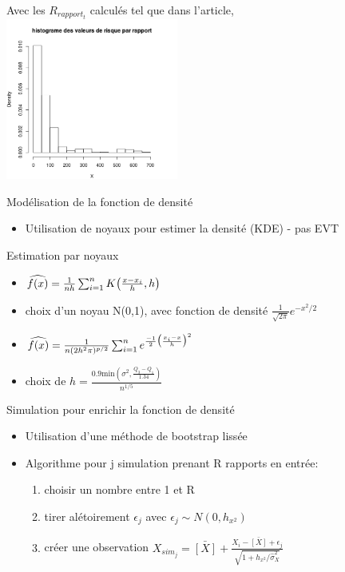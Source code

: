 \begin{frame}[t]
	Avec les $R_{rapport_t}$ calculés tel que dans l'article, \\
	\includegraphics[height=200px] {histogramme_par_rapport}
	
\end{frame}


\begin{frame}[t]
	
	Modélisation de la fonction de densité
	\begin{itemize}
	\item Utilisation de noyaux pour estimer la densité (KDE) - pas EVT
\end{itemize}

Estimation par noyaux 

\begin{itemize}
	\item $\widehat{f(x)} = \frac{1}{nh} \sum^{n}_{i=1}K\big{(} \frac{x-x_i}{h},h \big{)}$
	\item choix d'un noyau N(0,1), avec fonction de densité $\frac{1}{\sqrt{2\pi}}e^{-x^2/2}$
	\item $\widehat{f(x)} = \frac{1}{n(2h^2\pi)^{p/2}}\sum^{n}_{i=1}e^{\frac{-1}{2}\big{(}\frac{x_{i}-x}{h}\big{)}^2}$
	\item choix de $h = \frac{0.9 \textrm{min}(\sigma^2, \frac{Q_3-Q_1}{1.34})}{n^{1/5}}$
\end{itemize}


Simulation pour enrichir la fonction de densité

\begin{itemize}
	\item Utilisation d'une méthode de bootstrap lissée
	\item Algorithme pour j simulation prenant R rapports en entrée:
		\begin{enumerate}		
		\item choisir un nombre entre 1 et R 
		\item tirer alétoirement $\epsilon_j$ avec $\epsilon_j \sim N(0,h_{x^2})$ 		
		\item créer une observation $X_{sim_j} = \bar{[X]} + \frac{X_i - \bar{[X]} + \epsilon_j}{\sqrt{1+h_{x^2}/\hat{\sigma}^2_X}} 	$
		\end{enumerate}
	
\end{itemize}

\end{frame}



